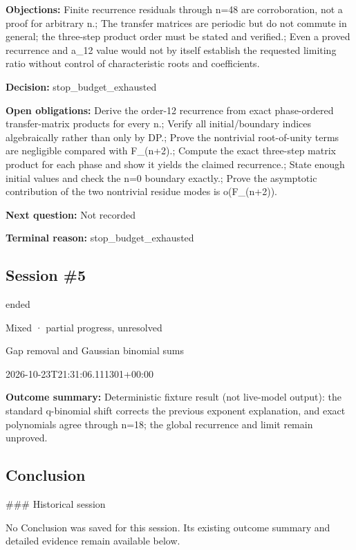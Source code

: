 \documentclass[11pt]{article}
\begin{document}
\textbf{Objections:} Finite recurrence residuals through n=48 are corroboration, not a proof for arbitrary n.; The transfer matrices are periodic but do not commute in general; the three-step product order must be stated and verified.; Even a proved recurrence and a\_12 value would not by itself establish the requested limiting ratio without control of characteristic roots and coefficients.\par
\textbf{Decision:} stop\_budget\_exhausted\par
\textbf{Open obligations:} Derive the order-12 recurrence from exact phase-ordered transfer-matrix products for every n.; Verify all initial/boundary indices algebraically rather than only by DP.; Prove the nontrivial root-of-unity terms are negligible compared with F\_(n+2).; Compute the exact three-step matrix product for each phase and show it yields the claimed recurrence.; State enough initial values and check the n=0 boundary exactly.; Prove the asymptotic contribution of the two nontrivial residue modes is o(F\_(n+2)).\par
\textbf{Next question:} Not recorded\par
\textbf{Terminal reason:} stop\_budget\_exhausted\par
\subsection{Session \#5}
\begin{description}[style=nextline,font=\normalfont\bfseries,leftmargin=0pt,labelsep=0pt]
\item[Execution status] ended
\item[Outcome] Mixed · partial progress, unresolved
\item[Strategy] Gap removal and Gaussian binomial sums
\item[Started] 2026-10-23T21:31:06.111301+00:00
\end{description}
\textbf{Outcome summary:} Deterministic fixture result (not live-model output): the standard q-binomial shift corrects the previous exponent explanation, and exact polynomials agree through n=18; the global recurrence and limit remain unproved.\par
\subsection{Conclusion}
\#\#\# Historical session

No Conclusion was saved for this session. Its existing outcome summary and detailed evidence remain available below.
\end{document}
